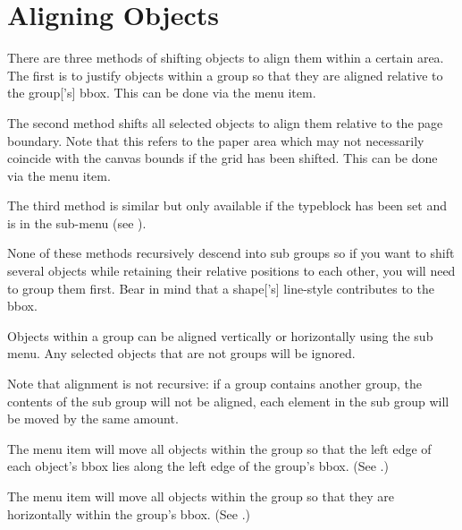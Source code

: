 \section{Aligning Objects}\label{sec:alignobjects}

There are three methods of shifting \glspl{object} to align them
within a certain area.
The first is to justify \glspl{object} within a \gls{group} so that
they are aligned relative to the \gls*{group}['s] \gls{bbox}.
This can be done via the  menu item.

The second method shifts all selected \glspl{object} to align them
relative to the page boundary. Note that this refers to the paper area which
may not necessarily coincide with the \gls{canvas} bounds if the
\gls{grid} has been shifted.
This can be done via the  menu item.

The third method is similar but only available if the
\gls{typeblock} has been set and is in the
sub-menu (see ).

None of these methods recursively descend into sub groups so if you want
to shift several \glspl{object} while retaining their relative
positions to each other, you will need to group them first.
Bear in mind that a \gls*{shape}['s] \gls{line-style} contributes to the \gls{bbox}. 


Objects within a \gls{group} can be aligned vertically or
horizontally using the  sub menu.
Any selected \glspl{object} that are not groups will be ignored.

Note that alignment is not recursive: if a group contains another
group, the contents of the sub group will not be aligned, each
element in the sub group will be moved by the same amount.


The  menu item will move all objects
within the \gls{group} so that the left edge of each object's \gls{bbox}
lies along the left edge of the group's \gls*{bbox}.  (See
.)


The  menu item will move all objects
within the \gls{group} so that they are  horizontally
within the group's \gls*{bbox}.  (See .)

